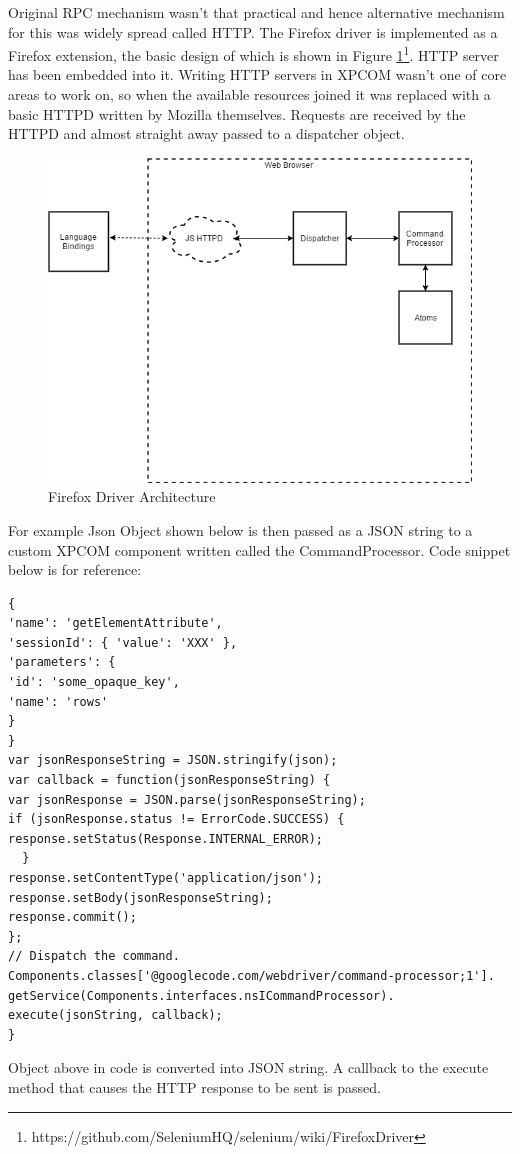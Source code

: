 \documentclass[article,type=msc,colorback,accentcolor=tud9c,twoside,11pt]{tudthesis}
\begin{document}
Original RPC mechanism wasn't that practical and hence alternative mechanism for this was widely spread called HTTP. The Firefox driver is implemented as a Firefox extension, the basic design of which is shown in Figure \ref{fig:Flowchart}\footnote{https://github.com/SeleniumHQ/selenium/wiki/FirefoxDriver}. HTTP server has been embedded into it. Writing HTTP servers in XPCOM wasn't one of core areas to work on, so when the available resources joined it was replaced with a basic HTTPD written by Mozilla themselves. Requests are received by the HTTPD and almost straight away passed to a dispatcher object.
\begin{figure}[h]
	\centering
	\includegraphics[scale=0.6]{SeleniumHttp.PNG}
	\caption{Firefox Driver Architecture}
	\label{fig:Flowchart}
\end{figure}
 For example Json Object shown below is then passed as a JSON string to a custom XPCOM component written called the CommandProcessor. Code snippet below is for reference:
\begin{lstlisting}
{
'name': 'getElementAttribute',
'sessionId': { 'value': 'XXX' },
'parameters': {
'id': 'some_opaque_key',
'name': 'rows'
}
}
var jsonResponseString = JSON.stringify(json);
var callback = function(jsonResponseString) {
var jsonResponse = JSON.parse(jsonResponseString);
if (jsonResponse.status != ErrorCode.SUCCESS) {
response.setStatus(Response.INTERNAL_ERROR);
  }
response.setContentType('application/json');
response.setBody(jsonResponseString);
response.commit();
};
// Dispatch the command.
Components.classes['@googlecode.com/webdriver/command-processor;1'].
getService(Components.interfaces.nsICommandProcessor).
execute(jsonString, callback);
}
\end{lstlisting}
Object above in code is converted into JSON string. A callback to the execute method that causes the HTTP response to be sent is passed.
\end{document}
